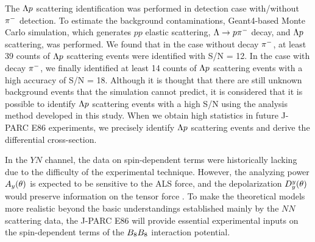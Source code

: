 The $\Lambda p$ scattering identification was performed in detection case  with/without $\pi^{-}$ detection. To estimate the background contaminations, Geant4-based Monte Carlo simulation, which generates $pp$ elastic scattering, $\Lambda\to p\pi^{-}$ decay, and $\Lambda p$ scattering, was performed. We found that in the case without decay $\pi^{-}$, at least 39 counts of $\Lambda p$ scattering events were identified with S/N = 12. In the case with decay $\pi^{-}$, we finally identified at least 14 counts of $\Lambda p$ scattering events with a high accuracy of S/N = 18. Although it is thought that there are still unknown background events that the simulation cannot predict, it is considered that it is possible to identify $\Lambda p$ scattering events with a high S/N using the analysis method developed in this study. When we obtain high statistics in future J-PARC E86 experiments, we precisely identify $\Lambda p$ scattering events and derive the differential cross-section.

In the $YN$ channel, the data on spin-dependent terms were historically lacking due to the difficulty of the experimental technique. However, the analyzing power $A_{y}(\theta)$ is expected to be sensitive to the ALS force, and the depolarization $D^{y}_{y}(\theta)$ would preserve information on the tensor force \cite{Ishikawa-2004}. To make the theoretical models more realistic beyond the basic understandings established mainly by the $NN$ scattering data, the J-PARC E86 will provide essential experimental inputs on the spin-dependent terms of the $B_{8}B_{8}$ interaction potential.

%
